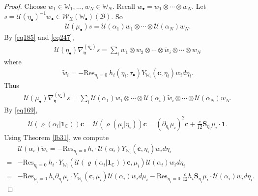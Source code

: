 \documentclass[12pt,b5paper,notitlepage]{report}
\theoremstyle{definition}
\theoremstyle{plain}
\newcommand{\fk}{\mathfrak}
\newcommand{\mc}{\mathcal}
\newcommand{\wtd}{\widetilde}
\newcommand{\wht}{\widehat}
\newcommand{\id}{\mathbf{1}}
\newcommand{\Res}{\mathrm{Res}}
\newcommand{\scr}{\mathscr}
\newcommand{\yk}{\mathfrak y}
\newcommand{\blt}{\bullet}
\newcommand{\Wbb}{\mathbb W}
\newcommand{\Cbb}{\mathbb C}
\newcommand{\cbf}{\mathbf c}
\newcommand{\Sbf}{\mathbf{S}}
\numberwithin{equation}{section}
\begin{document}
\begin{proof}
	
	
Choose $w_1\in\Wbb_1,\dots,w_N\in\Wbb_N$. Recall $w_\blt=w_1\otimes\cdots\otimes w_N$. Let $s=\mc U(\eta_\blt)^{-1}w_\blt\in\scr W_{\fk X}(\Wbb_\blt)(\mc B)$. So
\begin{align}
\mc U(\mu_\blt)s=\mc U(\alpha_1)w_1\otimes\cdots\otimes \mc U(\alpha_N)w_N.\label{eq250}
\end{align}
By \eqref{eq185} and \eqref{eq247}, 
\begin{align*}
\mc U(\eta_\blt)\nabla_\yk^{(\eta_\blt)} s=\sum_i w_1\otimes w_2\otimes\cdots\otimes \wtd w_i\otimes\cdots\otimes w_N
\end{align*}
where
\begin{align*}
\wtd w_i=-\Res_{\eta_i=0}~h_i(\eta_i,\tau_\blt)Y_{\Wbb_i}(\cbf,\eta_i)w_i d\eta_i.
\end{align*}
Thus
\begin{align}
\mc U(\mu_\blt)\nabla_\yk^{(\eta_\blt)} s=\sum_i \mc U(\alpha_1)w_1\otimes\cdots\otimes \mc U(\alpha_i)\wtd w_i\otimes\cdots\otimes\mc U(\alpha_N) w_N.\label{eq251}
\end{align}
By \eqref{eq169},
\begin{align*}
\mc U(\varrho(\alpha_i|\id_\Cbb))\cbf=\mc U(\varrho(\mu_i|\eta_i))\cbf=(\partial_{\eta_i}\mu_i)^2\cbf+\frac c{12}\Sbf_{\eta_i}\mu_i\cdot\id.
\end{align*}
Using Theorem \ref{lb31}, we compute
\begin{align}
&\mc U(\alpha_i)\wtd w_i=-\Res_{\eta_i=0~}h_i\cdot\mc  U(\alpha_i)Y_{\Wbb_i}(\cbf,\eta_i)w_i d\eta_i\nonumber\\
=&-\Res_{\eta_i=0}~h_i\cdot  Y_{\Wbb_i}(\mc U(\varrho(\alpha_i|\id_\Cbb))\cbf,\mu_i)\mc U(\alpha_i)w_i d\eta_i\nonumber\\
=&-\Res_{\mu_i=0}~h_i \partial_{\eta_i}\mu_i\cdot Y_{\Wbb_i}(\cbf,\mu_i)\mc U(\alpha_i)w_i d\mu_i-\Res_{\eta_i=0}~ \frac c{12}h_i\Sbf_{\eta_i}\mu_i\cdot \mc U(\alpha_i)w_i d\eta_i.\label{eq252}
\end{align}







\end{proof}
\end{document}
